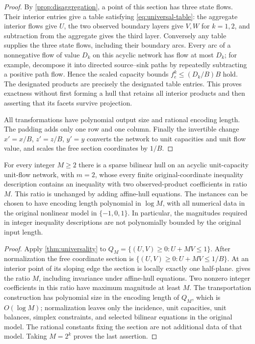 \begin{proof}
By \cref{prop:disaggregation}, a point of this section has three state
flows. Their interior entries give a table satisfying
\eqref{eq:universal-table}: the aggregate interior flows give $U$,
the two observed boundary layers give $V,W$ for $k=1,2$, and
subtraction from the aggregate gives the third layer. Conversely any
table supplies the three state flows, including their boundary arcs.
Every arc of a nonnegative flow of value $D_k$ on this acyclic network
has flow at most $D_k$; for example, decompose it into directed
source--sink paths by repeatedly subtracting a positive path flow.
Hence the scaled capacity bounds $f^k_e\le(D_k/B)B$ hold.
The designated products are precisely the designated table entries.
This proves exactness without first forming a hull that retains all
interior products and then asserting that its facets survive projection.

All transformations have polynomial output size and rational encoding
length. The padding adds only one row and one column. Finally the
invertible change $x'=x/B$, $z'=z/B$, $y'=y$ converts the network
to unit capacities and unit flow value, and scales the free section
coordinates by $1/B$.
\end{proof}

\begin{corollary}\label{cor:universal-coefficients}
For every integer $M\ge2$ there is a sparse bilinear hull on an acyclic
unit-capacity unit-flow network, with $m=2$, whose every finite
original-coordinate inequality description contains an inequality with
two observed-product coefficients in ratio $M$. This ratio is unchanged
by adding affine-hull equations. The instances can be chosen to have
encoding length polynomial in $\log M$, with all numerical data in the
original nonlinear model in $\{-1,0,1\}$. In particular, the magnitudes
required in integer inequality descriptions are not polynomially bounded
by the original input length.
\end{corollary}
\begin{proof}
Apply \cref{thm:universality} to
$Q_M=\{(U,V)\ge0:U+MV\le1\}$. After normalization the free
coordinate section is $\{(U,V)\ge0:U+MV\le1/B\}$.
At an interior point of its sloping edge the section is locally exactly
one half-plane.  gives the ratio $M$, including
invariance under affine-hull equations. Two nonzero integer coefficients
in this ratio have maximum magnitude at least $M$.
The transportation construction has polynomial size in the encoding
length of $Q_M$, which is $O(\log M)$; normalization leaves only the
incidence, unit capacities, unit balances, simplex constraints, and
selected bilinear equations in the original model. The rational constants
fixing the section are not additional data of that model.
Taking $M=2^k$ proves the last assertion.
\end{proof}

